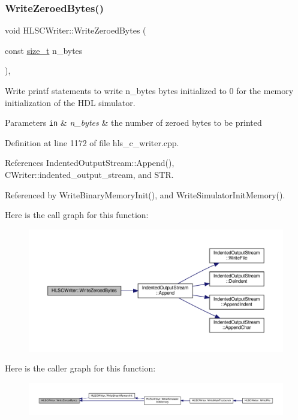 \subsubsection{\texorpdfstring{Write\+Zeroed\+Bytes()}{WriteZeroedBytes()}}
{\footnotesize\ttfamily void H\+L\+S\+C\+Writer\+::\+Write\+Zeroed\+Bytes (\begin{DoxyParamCaption}\item[{const \hyperlink{tutorial__fpt__2017_2intro_2sixth_2test_8c_a7c94ea6f8948649f8d181ae55911eeaf}{size\+\_\+t}}]{n\+\_\+bytes }\end{DoxyParamCaption})\hspace{0.3cm}{\ttfamily [inline]}, {\ttfamily [protected]}}



Write printf statements to write n\+\_\+bytes bytes initialized to 0 for the memory initialization of the H\+DL simulator. 


\begin{DoxyParams}[1]{Parameters}
\mbox{\tt in}  & {\em n\+\_\+bytes} & the number of zeroed bytes to be printed \\
\hline
\end{DoxyParams}


Definition at line 1172 of file hls\+\_\+c\+\_\+writer.\+cpp.



References Indented\+Output\+Stream\+::\+Append(), C\+Writer\+::indented\+\_\+output\+\_\+stream, and S\+TR.



Referenced by Write\+Binary\+Memory\+Init(), and Write\+Simulator\+Init\+Memory().

Here is the call graph for this function\+:
\nopagebreak
\begin{figure}[H]
\begin{center}
\leavevmode
\includegraphics[width=350pt]{d4/db1/classHLSCWriter_a38348640f023a8c42330e4131263ece8_cgraph}
\end{center}
\end{figure}
Here is the caller graph for this function\+:
\nopagebreak
\begin{figure}[H]
\begin{center}
\leavevmode
\includegraphics[width=350pt]{d4/db1/classHLSCWriter_a38348640f023a8c42330e4131263ece8_icgraph}
\end{center}
\end{figure}


